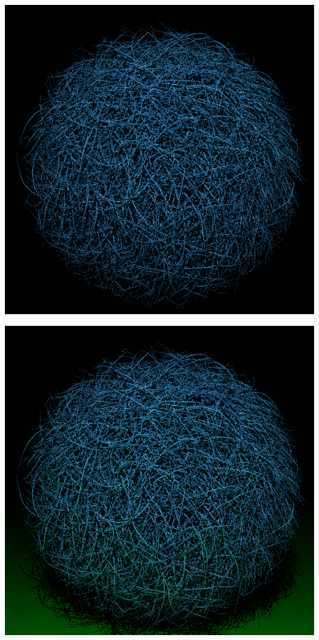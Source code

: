 \begin{center}
\begin{minipage}{0.48\linewidth}
\includegraphics[width=\linewidth]{img/hairball.png}
\end{minipage}
\begin{minipage}{0.48\linewidth}
\includegraphics[width=\linewidth]{img/hairball-plane.png}
\end{minipage}
\end{center}

